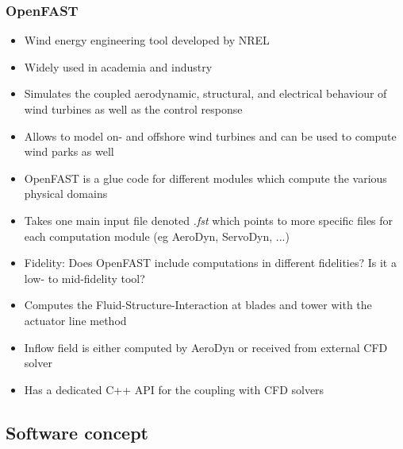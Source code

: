 \subsubsection{OpenFAST}
\begin{itemize}
	\item Wind energy engineering tool developed by NREL
	\item Widely used in academia and industry
	\item Simulates the coupled aerodynamic, structural, and electrical behaviour of wind turbines as well as the control response
	\item Allows to model on- and offshore wind turbines and can be used to compute wind parks as well
	\item OpenFAST is a glue code for different modules which compute the various physical domains
	\item Takes one main input file denoted \textit{.fst} which points to more specific files for each computation module (eg AeroDyn, ServoDyn, ...)
	\item Fidelity: Does OpenFAST include computations in different fidelities? Is it a low- to mid-fidelity tool?
	\item Computes the Fluid-Structure-Interaction at blades and tower with the actuator line method
	\item Inflow field is either computed by AeroDyn or received from external CFD solver
	\item Has a dedicated C++ API for the coupling with CFD solvers
\end{itemize}

\subsection{Software concept}

